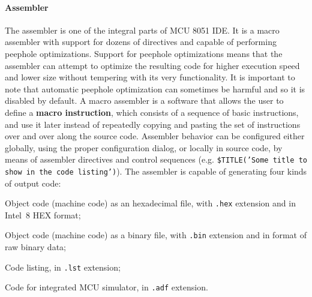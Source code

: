 \documentclass[a4paper,twoside,12pt]{book}
\newcommand{\fileextension}[1]{\texttt{#1}}
\begin{document}
		\paragraph{Assembler} The assembler is one of the integral parts of MCU 8051 IDE. It is a macro assembler with support for dozens of directives and capable of performing peephole optimizations. Support for peephole optimizations means that the assembler can attempt to optimize the resulting code for higher execution speed and lower size without tempering with its very functionality. It is important to note that automatic peephole optimization can sometimes be harmful and so it is disabled by default. A macro assembler is a software that allows  the user to define a \textbf{macro instruction}, which consists of a sequence of basic instructions, and use it later instead of repeatedly copying and pasting the set of instructions over and over along the source code. Assembler behavior can be configured either globally, using the proper configuration dialog, or locally in source code, by means of assembler directives and control sequences (e.g. \texttt{\$TITLE('Some title to show in the code listing')}). The
assembler is capable of generating four kinds of output code:
		\begin{dinglist}{43}
			\setlength{\itemsep}{-3pt}
			\item Object code (machine code) as an hexadecimal file, with \fileextension{.hex} extension and in Intel\textregistered\ 8 HEX format;
			\item Object code (machine code) as a binary file, with \fileextension{.bin} extension and in format of raw binary data;
			\item Code listing, in \fileextension{.lst} extension;
			\item Code for integrated MCU simulator, in \fileextension{.adf} extension.
		\end{dinglist}
\end{document}

